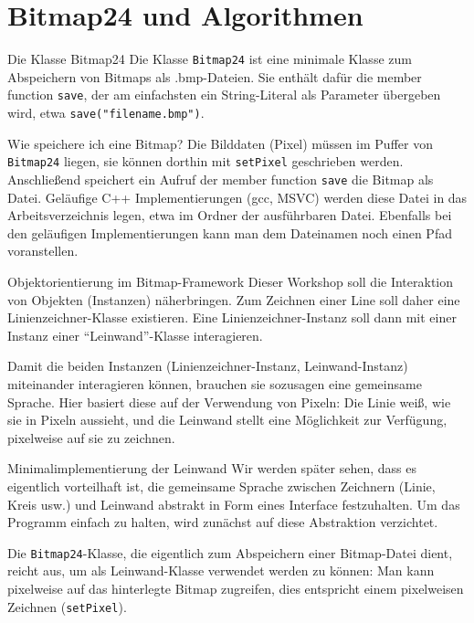 \section{Bitmap24 und Algorithmen}

\begin{frame}[fragile]{Die Klasse Bitmap24}
	Die Klasse \verb|Bitmap24| ist eine minimale Klasse zum Abspeichern von Bitmaps als .bmp-Dateien. Sie enthält dafür die member function \verb|save|, der am einfachsten ein String-Literal als Parameter übergeben wird, etwa \verb|save("filename.bmp")|.
	
	\pause
	
	\begin{block}{Wie speichere ich eine Bitmap?}
		Die Bilddaten (Pixel) müssen im Puffer von \verb|Bitmap24| liegen, sie können dorthin mit \verb|setPixel| geschrieben werden. Anschließend speichert ein Aufruf der member function \verb|save| die Bitmap als Datei. Geläufige C++ Implementierungen (gcc, MSVC) werden diese Datei in das Arbeitsverzeichnis legen, etwa im Ordner der ausführbaren Datei. Ebenfalls bei den geläufigen Implementierungen kann man dem Dateinamen noch einen Pfad voranstellen.
	\end{block}
\end{frame}

\begin{frame}{Objektorientierung im Bitmap-Framework}
	Dieser Workshop soll die Interaktion von Objekten (Instanzen) näherbringen. Zum Zeichnen einer Line soll daher eine Linienzeichner-Klasse existieren. Eine Linienzeichner-Instanz soll dann mit einer Instanz einer \enquote{Leinwand}-Klasse interagieren.
	
	\pause
	\vspace{1em}
	
	Damit die beiden Instanzen (Linienzeichner-Instanz, Leinwand-Instanz) miteinander interagieren können, brauchen sie sozusagen eine gemeinsame Sprache. Hier basiert diese auf der Verwendung von Pixeln: Die Linie weiß, wie sie in Pixeln aussieht, und die Leinwand stellt eine Möglichkeit zur Verfügung, pixelweise auf sie zu zeichnen.
\end{frame}

\begin{frame}[fragile]{Minimalimplementierung der Leinwand}
	Wir werden später sehen, dass es eigentlich vorteilhaft ist, die gemeinsame Sprache zwischen Zeichnern (Linie, Kreis usw.) und Leinwand abstrakt in Form eines Interface festzuhalten. Um das Programm einfach zu halten, wird zunächst auf diese Abstraktion verzichtet.
	
	\pause
	\vspace{1em}
	
	Die \verb|Bitmap24|-Klasse, die eigentlich zum Abspeichern einer Bitmap-Datei dient, reicht aus, um als Leinwand-Klasse verwendet werden zu können: Man kann pixelweise auf das hinterlegte Bitmap zugreifen, dies entspricht einem pixelweisen Zeichnen (\verb|setPixel|).
\end{frame}

